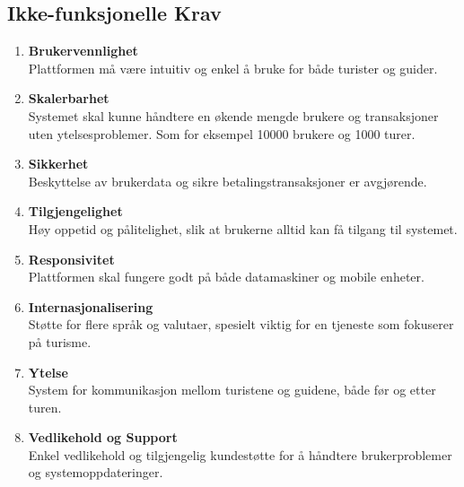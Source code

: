 \documentclass[../doc.tex]{subfiles}
\begin{document}
\subsection{Ikke-funksjonelle Krav}
\begin{enumerate}
    \item \textbf{Brukervennlighet} \\
    Plattformen må være intuitiv og enkel å bruke for både turister og guider.

    \item \textbf{Skalerbarhet} \\
    Systemet skal kunne håndtere en økende mengde brukere og transaksjoner uten ytelsesproblemer. Som for eksempel 10000 brukere og 1000 turer.

    \item \textbf{Sikkerhet} \\
    Beskyttelse av brukerdata og sikre betalingstransaksjoner er avgjørende.

    \item \textbf{Tilgjengelighet} \\ 
    Høy oppetid og pålitelighet, slik at brukerne alltid kan få tilgang til systemet.

    \item \textbf{Responsivitet} \\
    Plattformen skal fungere godt på både datamaskiner og mobile enheter.

    \item \textbf{Internasjonalisering} \\
    Støtte for flere språk og valutaer, spesielt viktig for en tjeneste som fokuserer på turisme.

    \item \textbf{Ytelse} \\
    System for kommunikasjon mellom turistene og guidene, både før og etter turen.

    \item \textbf{Vedlikehold og Support} \\
    Enkel vedlikehold og tilgjengelig kundestøtte for å håndtere brukerproblemer og systemoppdateringer.
\end{enumerate}
\end{document}
